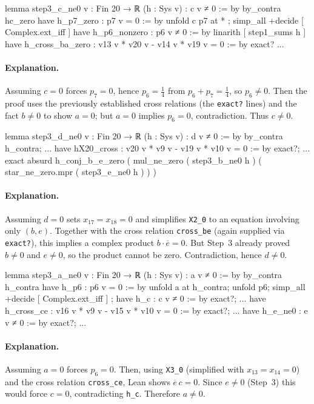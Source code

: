 \documentclass[11pt]{article}
\begin{document}
\begin{LeanCode}
lemma step3_c_ne0 {v : Fin 20 → ℝ} (h : Sys v) : c v ≠ 0 := by
  by_contra hc_zero
  have h_p7_zero : p7 v = 0 := by
    unfold c p7 at * ; simp_all +decide [ Complex.ext_iff ]
  have h_p6_nonzero : p6 v ≠ 0 := by
    linarith [ step1_sums h ]
  have h_cross_ba_zero : v13 v * v20 v - v14 v * v19 v = 0 := by
    exact?
  ...
\end{LeanCode}

\paragraph{Explanation.}
Assuming $c=0$ forces $p_7=0$, hence $p_6=\frac14$ from $p_6+p_7=\frac14$, so $p_6\neq 0$.
Then the proof uses the previously established cross relations (the \texttt{exact?} lines) and the fact $b\neq 0$ to show $a=0$; but $a=0$ implies $p_6=0$, contradiction.
Thus $c\neq 0$.

\begin{LeanCode}
lemma step3_d_ne0 {v : Fin 20 → ℝ} (h : Sys v) : d v ≠ 0 := by
  by_contra h_contra;
  ...
  have hX20_cross : v20 v * v9 v - v19 v * v10 v = 0 := by
    exact?;
  ...
  exact absurd h_conj_b_e_zero ( mul_ne_zero ( step3_b_ne0 h ) ( star_ne_zero.mpr ( step3_e_ne0 h ) ) )
\end{LeanCode}

\paragraph{Explanation.}
Assuming $d=0$ sets $x_{17}=x_{18}=0$ and simplifies \texttt{X2\_0} to an equation involving only $(b,e)$.
Together with the cross relation \texttt{cross\_be} (again supplied via \texttt{exact?}), this implies a complex product $b\cdot \overline{e}=0$.
But Step~3 already proved $b\neq 0$ and $e\neq 0$, so the product cannot be zero. Contradiction, hence $d\neq 0$.

\begin{LeanCode}
lemma step3_a_ne0 {v : Fin 20 → ℝ} (h : Sys v) : a v ≠ 0 := by
  by_contra h_contra
  have h_p6 : p6 v = 0 := by
    unfold a at h_contra; unfold p6; simp_all +decide [ Complex.ext_iff ] ;
  have h_c : c v ≠ 0 := by
    exact?;
  ...
  have h_cross_ce : v16 v * v9 v - v15 v * v10 v = 0 := by
    exact?;
  ...
  have h_e_ne0 : e v ≠ 0 := by
    exact?;
  ...
\end{LeanCode}

\paragraph{Explanation.}
Assuming $a=0$ forces $p_6=0$.
Then, using \texttt{X3\_0} (simplified with $x_{13}=x_{14}=0$) and the cross relation \texttt{cross\_ce}, Lean shows $\overline{e}\,c=0$.
Since $e\neq 0$ (Step~3) this would force $c=0$, contradicting \texttt{h\_c}.
Therefore $a\neq 0$.
\end{document}
